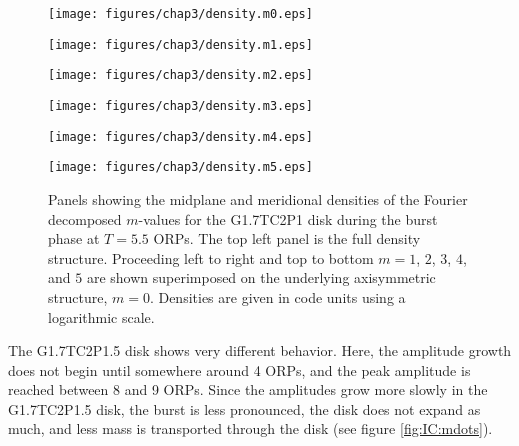 \begin{figure}[p]
\begin{minipage}{0.5\linewidth}
\centering
\texttt{[image: figures/chap3/density.m0.eps]}
\end{minipage}
\hspace{0.25in}
\begin{minipage}{0.5\linewidth}
\centering
\texttt{[image: figures/chap3/density.m1.eps]}
\end{minipage}
\vspace{0.25in}

\begin{minipage}{0.5\linewidth}
\centering
\texttt{[image: figures/chap3/density.m2.eps]}
\end{minipage}
\hspace{0.25in}
\begin{minipage}{0.5\linewidth}
\centering
\texttt{[image: figures/chap3/density.m3.eps]}
\end{minipage}
\vspace{0.25in}

\begin{minipage}{0.5\linewidth}
\centering
\texttt{[image: figures/chap3/density.m4.eps]}
\end{minipage}
\hspace{0.25in}
\begin{minipage}{0.5\linewidth}
\centering
\texttt{[image: figures/chap3/density.m5.eps]}
\end{minipage}
\caption[Fourier reconstructed midplane and meridional densities]{Panels showing the midplane and meridional densities of the Fourier decomposed $m$-values for the G1.7TC2P1 disk during the burst phase at $T = 5.5$ ORPs. The top left panel is the full density structure. Proceeding left to right and top to bottom $m = 1$, $2$, $3$, $4$, and $5$ are shown superimposed on the underlying axisymmetric structure, $m = 0$. Densities are given in code units using a logarithmic scale.}
\label{fig:IC:mdecomp}
\end{figure}

The G1.7TC2P1.5 disk shows very different behavior. Here, the amplitude growth does not begin until somewhere around 4 ORPs, and the peak amplitude is reached between 8 and 9 ORPs. Since the amplitudes grow more slowly in the G1.7TC2P1.5 disk, the burst is less pronounced, the disk does not expand as much, and less mass is transported through the disk (see figure \ref{fig:IC:mdots}).

